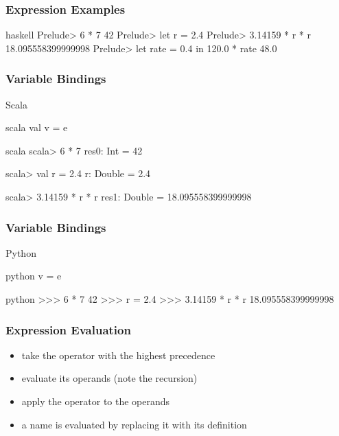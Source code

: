 \documentclass[dvipsnames]{beamer}
\theoremstyle{plain}
\begin{document}
\begin{frame}[fragile]
  \frametitle{Expression Examples}

  \begin{example}[Haskell]
    \begin{pygments}{haskell}
Prelude> 6 * 7
42
Prelude> let r = 2.4
Prelude> 3.14159 * r * r
18.095558399999998
Prelude> let rate = 0.4 in 120.0 * rate
48.0
    \end{pygments}
  \end{example}
\end{frame}

\begin{frame}[fragile]
  \frametitle{Variable Bindings}

  \begin{block}{Scala}
    \begin{pygments}{scala}
val v = e
    \end{pygments}
  \end{block}

  \pause
  \begin{example}[Scala]
    \begin{pygments}{scala}
scala> 6 * 7
res0: Int = 42

scala> val r = 2.4
r: Double = 2.4

scala> 3.14159 * r * r
res1: Double = 18.095558399999998
    \end{pygments}
  \end{example}
\end{frame}

\begin{frame}[fragile]
  \frametitle{Variable Bindings}

  \begin{block}{Python}
    \begin{pygments}{python}
v = e
    \end{pygments}
  \end{block}

  \pause
  \begin{example}[Python]
    \begin{pygments}{python}
>>> 6 * 7
42
>>> r = 2.4
>>> 3.14159 * r * r
18.095558399999998
    \end{pygments}
  \end{example}
\end{frame}

\begin{frame}
  \frametitle{Expression Evaluation}

  \begin{itemize}
    \item take the operator with the highest precedence
    \item evaluate its operands (note the recursion)
    \item apply the operator to the operands

    \pause
    \medskip
    \item a name is evaluated by replacing it with its definition
  \end{itemize}
\end{frame}
\end{document}

